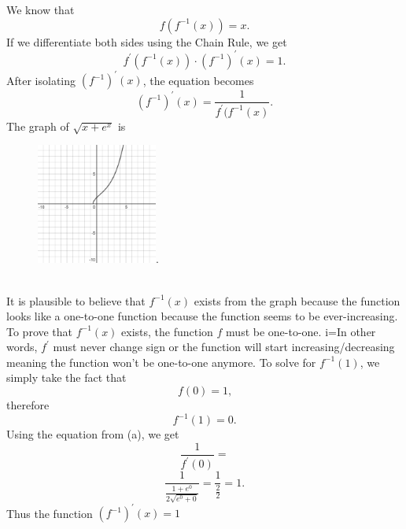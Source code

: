 \documentclass{article}
\begin{document}
We know that
\[f(f^{-1}(x))=x\text{.}\]
If we differentiate both sides using the Chain Rule, we get
\[f^{\prime}(f^{-1}(x))\cdot(f^{-1})^{\prime}(x)=1\text{.}\]
After isolating $(f^{-1})^{\prime}(x)$, the equation becomes
\[(f^{-1})^{\prime}(x)=\frac{1}{f^{\prime}(f^{-1}(x)}\text{.}\]
The graph of $\sqrt{x+e^x}$ is \\
\begin{figure}[h]
\includegraphics[scale=1.33333333333333333333333333333333333333333333333333333333333333333333333333333333333333333333333333]{graph1}.
\centering
\end{figure} \\
It is plausible to believe that $f^{-1}(x)$ exists from the graph because the function looks like a one-to-one function because the function seems to be ever-increasing. To prove that $f^{-1}(x)$ exists, the function $f$ must be one-to-one. i=In other words, $f^{\prime}$ must never change sign or the function will start increasing/decreasing meaning the function won't be one-to-one anymore. To solve for $f^{-1}(1)$, we simply take the fact that 
\[f(0)=1\text{,}\]
therefore
\[f^{-1}(1)=0\text{.}\]
Using the equation from (a), we get
\[\frac{1}{f^{\prime}(0)}=\]
\[\frac{1}{\frac{1 + e^0}{2 \sqrt{e^0 + 0}}}=\frac{1}{\frac{2}{2}}=1\text{.}\]
Thus the function $(f^{-1})^{\prime}(x)=1$

 
\end{document}
